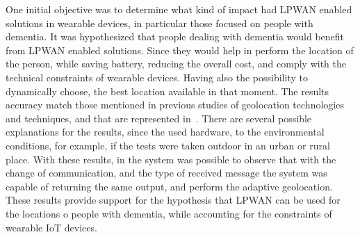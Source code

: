 One initial objective was to  determine what kind of impact had LPWAN enabled solutions in wearable devices, in particular those focused on people with dementia.\newline 
It was hypothesized that people dealing with dementia would benefit from LPWAN enabled solutions. Since they would help in perform the location of the person, while saving battery, reducing the overall cost, and comply with the technical constraints of wearable devices. Having also the possibility to dynamically choose, the best location available in that moment. \newline 
The results accuracy match those mentioned in previous studies of geolocation technologies and techniques, and that are represented in~.\newline 
There are several possible explanations for the results, since the used hardware, to the environmental conditions, for example, if the tests were taken outdoor in an urban or rural place. \newline 
With these results, in the system  was possible to observe that with the change of communication, and the type of received message the system was capable of returning the same output, and perform the adaptive geolocation.\newline 
These results provide support for the hypothesis that LPWAN can be used for the locations o people with dementia, while accounting for the constraints of wearable IoT devices.




